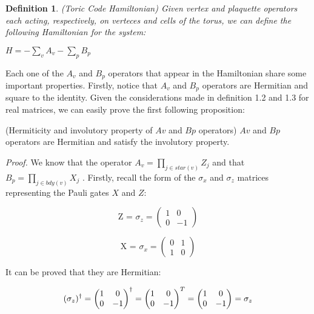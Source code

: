 \documentclass{Configuration_Files/PoliMi3i_thesis}
\newtheorem{definition}{Definition}[chapter]
\begin{document}
\begin{definition} (Toric Code Hamiltonian) Given vertex and plaquette operators each acting, respectively, on verteces and cells of the torus, we can define the following Hamiltonian for the system:
\end{definition}

\begin{center}
	
	$H = -\sum_{v} 
	A_v - \sum_{p} B_p $
	
\end{center}

Each one of the $A_v$ and $B_p$ operators that appear in the Hamiltonian share some important properties. Firstly, notice that $A_v$ and $B_p$ operators are Hermitian and square to the identity. Given the considerations made in definition 1.2 and 1.3 for real matrices, we can easily prove the first following proposition:

\begin{proposition} (Hermiticity and involutory property of $Av$ and $Bp$ operators)
$Av$ and $Bp$ operators are Hermitian and satisfy the involutory property.
\end{proposition}
	
\textit{Proof.}
We know that the operator $ A_v = \prod_{j \in star(v)} Z_j $ and that $ B_p = \prod_{j \in bdy(v)} X_j $ .\newline
Firstly, recall the form of the $\sigma_x$ and $\sigma_z$ matrices representing the Pauli gates $X$ and $Z$:



\[
\text{Z = $\sigma_z$} =
\begin{pmatrix}
	1 & 0 \\
	0 & -1
\end{pmatrix}
\]


\[
\text{X = $\sigma_x$} =
\begin{pmatrix}
	0 & 1 \\
	1 & 0
\end{pmatrix}
\]


It can be proved that they are Hermitian:\newline

\[
\text{$( \sigma_z )^{\dagger}$} = 
\begin{pmatrix}
	1 & 0 \\
	0 & -1
\end{pmatrix} ^\dagger =
\begin{pmatrix}
	1 & 0 \\
	0 & -1
\end{pmatrix}^T =
\begin{pmatrix}
	1 & 0 \\
	0 & -1
\end{pmatrix}
= \text{$ \sigma_z $}
\]
\end{document}
